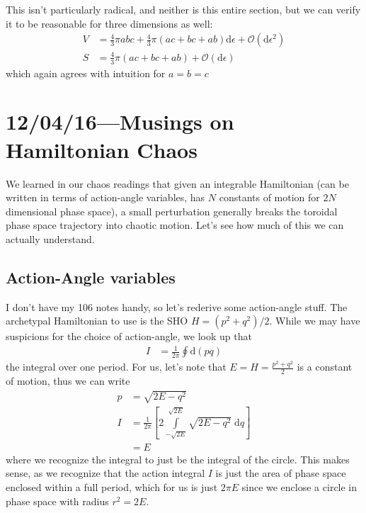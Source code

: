 \documentclass[12pt]{report}
\begin{document}
This isn't particularly radical, and neither is this entire section, but we can
verify it to be reasonable for three dimensions as well:
\begin{align}
    V &= \frac{4}{3}\pi abc + \frac{4}{3}\pi(ac + bc + ab)\mathrm{d}\epsilon
        + \mathcal{O}(\mathrm{d}\epsilon^2)\\
    S &= \frac{4}{3}\pi\left( ac + bc + ab \right)
        + \mathcal{O}(\mathrm{d}\epsilon)
\end{align}
which again agrees with intuition for $a=b=c$

\clearpage
\chapter{12/04/16---Musings on Hamiltonian Chaos}

We learned in our chaos readings that given an integrable Hamiltonian (can be
written in terms of action-angle variables, has $N$ constants of motion for $2N$
dimensional phase space), a small perturbation generally breaks the toroidal
phase space trajectory into chaotic motion. Let's see how much of this we can
actually understand.

\section{Action-Angle variables}

I don't have my 106 notes handy, so let's rederive some action-angle stuff. The
archetypal Hamiltonian to use is the SHO $H = (p^2 + q^2)/2$. While we may have
suspicions for the choice of action-angle, we look up that
\begin{align}
    I &= \frac{1}{2\pi}\oint \mathrm{d}(pq)
\end{align}
the integral over one period. For us, let's note that
$E = H = \frac{p^2 + q^2}{2}$
is a constant of motion, thus we can write
\begin{align}
    p &= \sqrt{2E - q^2}\\
    I &= \frac{1}{2\pi} \left[ 2 \int\limits_{-\sqrt{2E}}^{\sqrt{2E}}
        \sqrt{2E - q^2}\;\mathrm{d}q \right]\\
    &= E
\end{align}
where we recognize the integral to just be the integral of the circle. This
makes sense, as we recognize that the action integral $I$ is just the area of
phase space enclosed within a full period, which for us is just $2\pi E$ since
we enclose a circle in phase space with radius $r^2 = 2E$.
\end{document}
